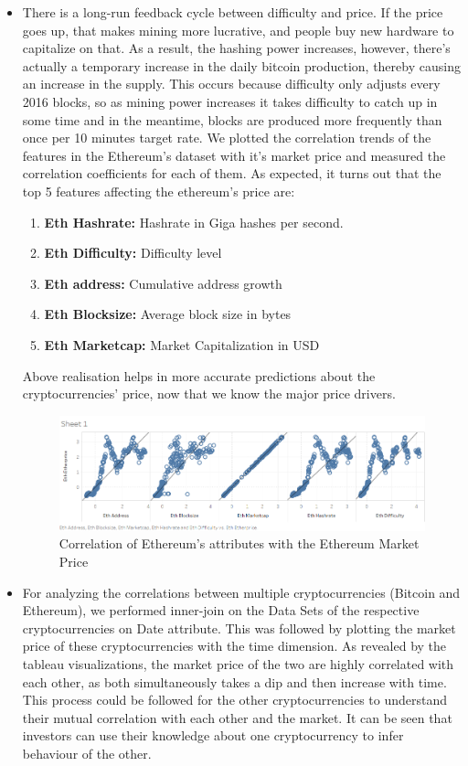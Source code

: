 \documentclass{article}
\begin{document}
\begin{itemize}
\item There is a long-run feedback cycle between difficulty and price. If the price goes up, that makes mining more lucrative, and people buy new hardware to capitalize on that. As a result, the hashing power increases, however, there’s actually a temporary increase in the daily bitcoin production, thereby causing an increase in the supply. This occurs because difficulty only adjusts every 2016 blocks, so as mining power increases it takes difficulty to catch up in some time and in the meantime, blocks are produced more frequently than once per 10 minutes target rate. We plotted the correlation trends of the features in the Ethereum's dataset with it's market price and measured the correlation coefficients for each of them. 
\newpage
As expected, it turns out that the top 5 features affecting the ethereum's price are:
\begin{enumerate}
\item \textbf{Eth Hashrate:} Hashrate in Giga hashes per second.
\item \textbf{Eth Difficulty:} Difficulty level 
\item \textbf{Eth address:} Cumulative address growth
\item \textbf{Eth Blocksize:} Average block size in bytes
\item \textbf{Eth Marketcap:} Market Capitalization in USD
\end{enumerate}
Above realisation helps in more accurate predictions about the cryptocurrencies' price, now that we know the major price drivers.
\begin{figure}[h]
    \centering
    \includegraphics[width=11cm]{correlation_coefficient.png}
    \caption{Correlation of Ethereum's attributes with the Ethereum Market Price}
    \label{fig:my_label}
\end{figure}

\item For analyzing the correlations between multiple cryptocurrencies (Bitcoin and Ethereum), we performed inner-join on the Data Sets of the respective cryptocurrencies on Date attribute. This was followed by plotting the market price of these cryptocurrencies with the time dimension. As revealed by the tableau visualizations, the market price of the two are highly correlated with each other, as both simultaneously takes a dip and then increase with time. This process could be followed for the other cryptocurrencies to understand their mutual correlation with each other and the market.
It can be seen that investors can use their knowledge about one cryptocurrency to infer behaviour of the other.


\end{itemize}
\end{document}
